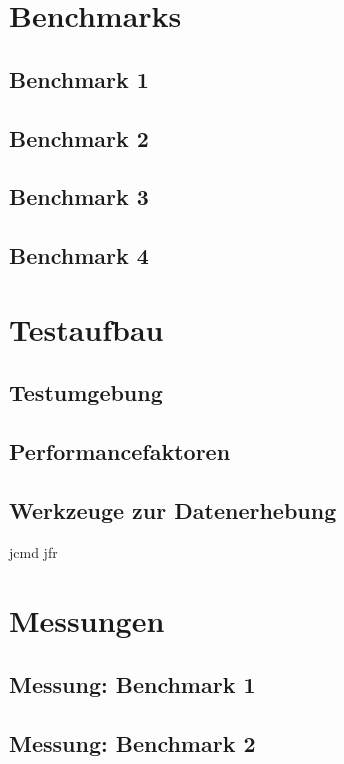 \documentclass[fontsize=12pt,paper=a4,twoside=semi,parskip=half-,headsepline,headinclude]{scrreprt}
\begin{document}
\chapter{Benchmarks}

\section{Benchmark 1}

\section{Benchmark 2}

\section{Benchmark 3}

\section{Benchmark 4}



\chapter{Testaufbau}

\section{Testumgebung}

\section{Performancefaktoren}

\section{Werkzeuge zur Datenerhebung}
jcmd
jfr



\chapter{Messungen}

\section{Messung: Benchmark 1}

\section{Messung: Benchmark 2}
\end{document}
